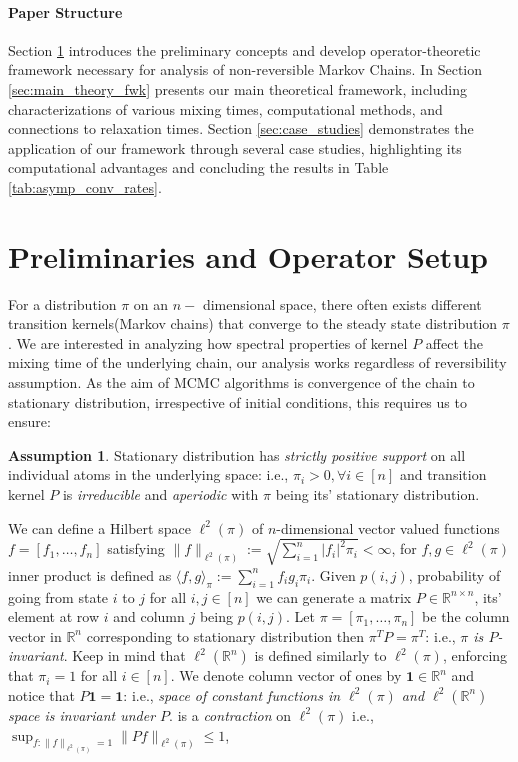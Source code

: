 \documentclass[preprint]{imsart}
\theoremstyle{plain}
\theoremstyle{definition}
\newtheorem{assumption}{Assumption}
\begin{document}
\paragraph{Paper Structure}
Section \ref{sec:prelim} introduces the preliminary concepts and develop operator-theoretic framework necessary for analysis of non-reversible Markov Chains. In Section \ref{sec:main_theory_fwk} presents our main theoretical framework, including characterizations of various mixing times, computational methods, and connections to relaxation times. Section \ref{sec:case_studies} demonstrates the application of our framework through several case studies, highlighting its computational advantages and concluding the results in Table \ref{tab:asymp_conv_rates}. 

\section{Preliminaries and Operator Setup}
\label{sec:prelim}
For a distribution $\pi$ on an $n-$ dimensional space, there often exists different transition kernels(Markov chains) that converge to the steady state distribution $\pi$. We are interested in analyzing how spectral properties of kernel $P$ affect the mixing time of the underlying chain, our analysis works regardless of reversibility assumption. As the aim of MCMC algorithms is convergence of the chain to stationary distribution, irrespective of initial conditions, this requires us to ensure:  
\begin{assumption}
 Stationary distribution has \emph{strictly positive support} on all individual atoms in the underlying space: i.e., $\pi_{i}>0, \forall i \in [n]$ and transition kernel $P$ is \emph{irreducible} and \emph{aperiodic} with $\pi$ being its' stationary distribution.
\end{assumption}
We can define a Hilbert space $\ell^{2}(\pi)$ of $n$-dimensional vector valued functions $f=[f_{1},\ldots,f_{n}]$ satisfying $\|f\|_{\ell^{2}(\pi)}:=\sqrt{\sum_{i=1}^{n}|f_{i}|^{2}\pi_{i}}<\infty$, for $f,g \in \ell^{2}(\pi)$ inner product is defined as $\langle f,g\rangle_{\pi}:=\sum_{i=1}^{n}f_{i}g_{i}\pi_{i}$.  Given $p(i,j)$, probability of going from state $i$ to $j$ for all $i,j \in [n]$ we can generate a matrix $P \in \mathbb{R}^{n \times n}$, its' element at row $i$ and column $j$ being $p(i,j)$. Let $\pi=[\pi_{1},\ldots,\pi_{n}]$ be the column vector in $\mathbb{R}^{n}$ corresponding to stationary distribution then $\pi^{T}P=\pi^{T}$: i.e., \emph{$\pi$ is $P$-invariant}. Keep in mind that $\ell^{2}(\mathbb{R}^{n})$ is defined similarly to $\ell^{2}(\pi)$, enforcing that $\pi_{i}=1$ for all $i \in [n]$. We denote column vector of ones by $\mathbf{1} \in \mathbb{R}^{n}$ and notice that $P\mathbf{1}=\mathbf{1}$: i.e., \emph{space of constant functions in $\ell^{2}(\pi)$ and $\ell^{2}(\mathbb{R}^{n})$ space is invariant under $P$}.         is a \emph{contraction} on $\ell^{2}(\pi)$ i.e., $\sup_{f:\|f\|_{\ell^{2}(\pi)}=1}\|Pf\|_{\ell^{2}(\pi)} \leq 1$,
\end{document}
